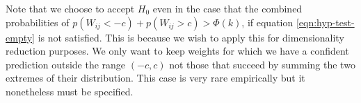 Note that we choose to accept $H_0$ even in the case that the combined probabilities of $p(W_{ij} < -c) + p(W_{ij} > c) > \Phi(k)$, if equation \ref{eqn:hyp-test-empty} is not satisfied. This is because we wish to apply this for dimensionality reduction purposes. We only want to keep weights for which we have a confident prediction outside the range $(-c, c)$ not those that succeed by summing the two extremes of their distribution. This case is very rare empirically but it nonetheless must be specified.